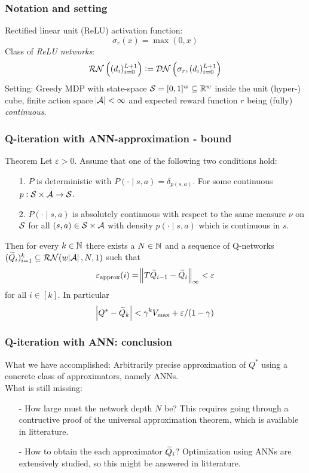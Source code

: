 \documentclass{beamer}[10]
\begin{document}
\begin{frame}
  \frametitle{Notation and setting}
  Rectified linear unit (ReLU) activation function:
  \[ \sigma_r(x) = \max(0,x) \]
  Class of \emph{ReLU networks}:
  \[ \mathcal{RN}\left( (d_i)_{i=0}^{L+1} \right)
  \vcentcolon= \mathcal{DN}\left( \sigma_r, (d_i)_{i=0}^{L+1} \right) \] 
  Setting: Greedy MDP with state-space $\mathcal{S} = [0,1]^w \subseteq \mathbb{R}^w$
  inside the unit (hyper-) cube, finite action space $\abs{\mathcal{A}} < \infty$ and 
  expected reward function $r$ being (fully) \emph{continuous}.
\end{frame}

\begin{frame}
  \frametitle{Q-iteration with ANN-approximation - bound}
  \begingroup \footnotesize
  \begin{block}{Theorem}
    Let $\varepsilon > 0$.
    Assume that one of the following two conditions hold:
    \begin{itemize}
      \item[1.] $P$ is deterministic with $P(\cdot \mid s, a) = \delta_{p(s, a)}$.
	For some continuous $p: \mathcal{S} \times \mathcal{A} \to \mathcal{S}$.
      \item[2.] $P(\cdot \mid s, a)$ is absolutely continuous
	with respect to the same measure $\nu$ on $\mathcal{S}$ for all
	$(s, a) \in \mathcal{S} \times \mathcal{A}$ with density
	$p(\cdot \mid s, a)$ which is continuous in $s$.
    \end{itemize}
    Then for every $k \in \mathbb{N}$ there exists a $N\in \mathbb{N}$ and a sequence of
    Q-networks $(\widetilde{Q}_i)_{i=1}^k \subseteq \mathcal{RN}(w \abs{\mathcal{A}}, N, 1)$
    such that
    \[ \varepsilon_{\mathrm{approx}}(i) = \norm{T\widetilde{Q}_{i-1} - \widetilde{Q}_i}_\infty < \varepsilon \]
    for all $i \in [k]$.
    In particular
    \[ \abs{Q^* - \widetilde{Q}_k} < \gamma^k V_{\max} + \varepsilon/(1 - \gamma) \]
  \end{block}
  \endgroup
\end{frame}

\begin{frame}
  \frametitle{Q-iteration with ANN: conclusion}
  What we have accomplished: Arbitrarily precise approximation of $Q^*$ using
  a concrete class of approximators, namely ANNs.
  \\ What is still missing:
  \begin{itemize}
    \item[-] How large must the network depth $N$ be?
      This requires going through a contructive proof of the universal
      approximation theorem, which is available in litterature.
    \item[-] How to obtain the each approximator $\widetilde{Q}_i$? Optimization
      using ANNs are extensively studied, so this might be answered in
      litterature.
  \end{itemize}
\end{frame}
\end{document}
